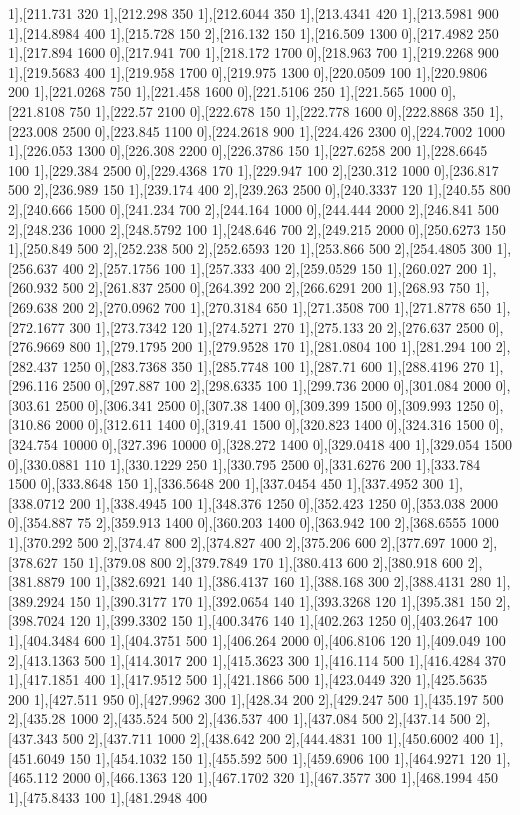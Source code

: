 {1],[211.731 320 1],[212.298 350 1],[212.6044 350 1],[213.4341 420 1],[213.5981 900 1],[214.8984 400 1],[215.728 150 2],[216.132 150 1],[216.509 1300 0],[217.4982 250 1],[217.894 1600 0],[217.941 700 1],[218.172 1700 0],[218.963 700 1],[219.2268 900 1],[219.5683 400 1],[219.958 1700 0],[219.975 1300 0],[220.0509 100 1],[220.9806 200 1],[221.0268 750 1],[221.458 1600 0],[221.5106 250 1],[221.565 1000 0],[221.8108 750 1],[222.57 2100 0],[222.678 150 1],[222.778 1600 0],[222.8868 350 1],[223.008 2500 0],[223.845 1100 0],[224.2618 900 1],[224.426 2300 0],[224.7002 1000 1],[226.053 1300 0],[226.308 2200 0],[226.3786 150 1],[227.6258 200 1],[228.6645 100 1],[229.384 2500 0],[229.4368 170 1],[229.947 100 2],[230.312 1000 0],[236.817 500 2],[236.989 150 1],[239.174 400 2],[239.263 2500 0],[240.3337 120 1],[240.55 800 2],[240.666 1500 0],[241.234 700 2],[244.164 1000 0],[244.444 2000 2],[246.841 500 2],[248.236 1000 2],[248.5792 100 1],[248.646 700 2],[249.215 2000 0],[250.6273 150 1],[250.849 500 2],[252.238 500 2],[252.6593 120 1],[253.866 500 2],[254.4805 300 1],[256.637 400 2],[257.1756 100 1],[257.333 400 2],[259.0529 150 1],[260.027 200 1],[260.932 500 2],[261.837 2500 0],[264.392 200 2],[266.6291 200 1],[268.93 750 1],[269.638 200 2],[270.0962 700 1],[270.3184 650 1],[271.3508 700 1],[271.8778 650 1],[272.1677 300 1],[273.7342 120 1],[274.5271 270 1],[275.133 20 2],[276.637 2500 0],[276.9669 800 1],[279.1795 200 1],[279.9528 170 1],[281.0804 100 1],[281.294 100 2],[282.437 1250 0],[283.7368 350 1],[285.7748 100 1],[287.71 600 1],[288.4196 270 1],[296.116 2500 0],[297.887 100 2],[298.6335 100 1],[299.736 2000 0],[301.084 2000 0],[303.61 2500 0],[306.341 2500 0],[307.38 1400 0],[309.399 1500 0],[309.993 1250 0],[310.86 2000 0],[312.611 1400 0],[319.41 1500 0],[320.823 1400 0],[324.316 1500 0],[324.754 10000 0],[327.396 10000 0],[328.272 1400 0],[329.0418 400 1],[329.054 1500 0],[330.0881 110 1],[330.1229 250 1],[330.795 2500 0],[331.6276 200 1],[333.784 1500 0],[333.8648 150 1],[336.5648 200 1],[337.0454 450 1],[337.4952 300 1],[338.0712 200 1],[338.4945 100 1],[348.376 1250 0],[352.423 1250 0],[353.038 2000 0],[354.887 75 2],[359.913 1400 0],[360.203 1400 0],[363.942 100 2],[368.6555 1000 1],[370.292 500 2],[374.47 800 2],[374.827 400 2],[375.206 600 2],[377.697 1000 2],[378.627 150 1],[379.08 800 2],[379.7849 170 1],[380.413 600 2],[380.918 600 2],[381.8879 100 1],[382.6921 140 1],[386.4137 160 1],[388.168 300 2],[388.4131 280 1],[389.2924 150 1],[390.3177 170 1],[392.0654 140 1],[393.3268 120 1],[395.381 150 2],[398.7024 120 1],[399.3302 150 1],[400.3476 140 1],[402.263 1250 0],[403.2647 100 1],[404.3484 600 1],[404.3751 500 1],[406.264 2000 0],[406.8106 120 1],[409.049 100 2],[413.1363 500 1],[414.3017 200 1],[415.3623 300 1],[416.114 500 1],[416.4284 370 1],[417.1851 400 1],[417.9512 500 1],[421.1866 500 1],[423.0449 320 1],[425.5635 200 1],[427.511 950 0],[427.9962 300 1],[428.34 200 2],[429.247 500 1],[435.197 500 2],[435.28 1000 2],[435.524 500 2],[436.537 400 1],[437.084 500 2],[437.14 500 2],[437.343 500 2],[437.711 1000 2],[438.642 200 2],[444.4831 100 1],[450.6002 400 1],[451.6049 150 1],[454.1032 150 1],[455.592 500 1],[459.6906 100 1],[464.9271 120 1],[465.112 2000 0],[466.1363 120 1],[467.1702 320 1],[467.3577 300 1],[468.1994 450 1],[475.8433 100 1],[481.2948 400 }
